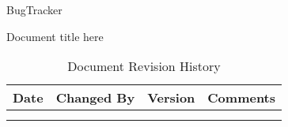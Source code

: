 \documentclass[a4paper]{article}
\begin{document}
\begin{titlepage}
    \vspace*{\fill}
        \begin{center}
            \huge
            BugTracker
            
            \vspace{0.4cm}
            \Huge
            Document title here
            
            \vspace{3cm}
            \begin{table}[h]
            \centering
                \caption{Document Revision History}
                \begin{tabular}{cccc}
                    \hline
                    Date & Changed By & Version & Comments \\
                    \hline 
                    \hfill & \hfill & \hfill & \hfill \\
                    \hfill & \hfill & \hfill & \hfill \\
                    \hline
                \end{tabular}
            \end{table}
        \end{center}
    \vspace*{\fill}
\end{titlepage}

\tableofcontents
\end{document}
